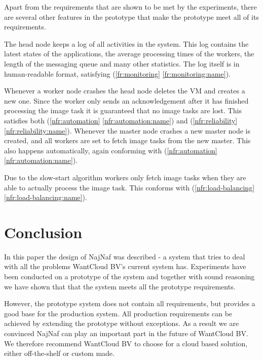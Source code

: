 \documentclass[10pt,journal,compsoc]{IEEEtran}
\def\namedref#1{\ref{#1} \ref{#1:name}}
\begin{document}
Apart from the requirements that are shown to be met by the experiments, there
are several other features in the prototype that make the prototype meet all of its
requirements.

The head node keeps a log of all activities in the system. This log contains the
latest states of the applications, the average processing times of the workers,
the length of the messaging queue and many other statistics. The log itself is in
human-readable format, satisfying (\namedref{fr:monitoring}).

Whenever a worker node crashes the head node deletes the VM and creates a new
one. Since the worker only sends an acknowledgement after it has finished
processing the image task it is guaranteed that no image tasks are lost. This
satisfies both (\namedref{nfr:automation}) and (\namedref{nfr:reliability}).
Whenever the master node crashes a new master node is created, and all workers
are set to fetch image tasks from the new master. This also happens automatically,
again conforming with (\namedref{nfr:automation}).

Due to the slow-start algorithm workers only fetch image tasks when they are able
to actually process the image task. This conforms with
(\namedref{nfr:load-balancing}).

\section{Conclusion}
\label{sec:Conclusion}
In this paper the design of NajNaf was described - a system that tries to deal
with all the problems WantCloud BV's current system has. Experiments have been
conducted on a prototype of the system and together with sound reasoning we have shown that that the system
meets all the prototype requirements.

However, the prototype system does not contain all requirements, but provides a good base
for the production system. All production requirements can be achieved by
extending the prototype without exceptions. As a result we are convinced NajNaf
can play an important part in the future of WantCloud BV. We therefore recommend
WantCloud BV to choose for a cloud based solution, either off-the-shelf or
custom made.



\appendices
\end{document}

